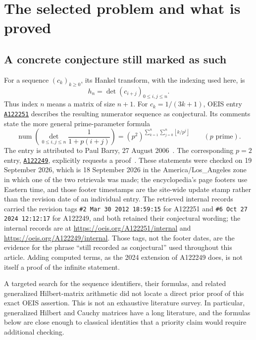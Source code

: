 \documentclass[11pt,a4paper]{article}
\numberwithin{equation}{section}
\theoremstyle{definition}
\theoremstyle{remark}
\newcommand{\num}{\operatorname{num}}
\newcommand{\floor}[1]{\left\lfloor#1\right\rfloor}
\newcommand{\OEIS}[1]{\href{https://oeis.org/#1}{\texttt{#1}}}
\begin{document}
\section{The selected problem and what is proved}\label{sec:problem}

\subsection{A concrete conjecture still marked as such}
For a sequence $(c_k)_{k\geq0}$, its Hankel transform, with the indexing used here, is
\[
 h_n=\det(c_{i+j})_{0\leq i,j\leq n}.
\]
Thus index $n$ means a matrix of size $n+1$. For $c_k=1/(3k+1)$, OEIS entry \OEIS{A122251} describes the resulting numerator sequence as conjectural. Its comments state the more general prime-parameter formula
\begin{equation}\label{eq:original}
 \num\left(\det_{0\leq i,j\leq n}\frac1{1+p(i+j)}\right)
 =(p^2)^{\displaystyle\sum_{k=1}^n\sum_{j=0}^n\floor{k/p^j}}
 \qquad(p\text{ prime}).
\end{equation}
The entry is attributed to Paul Barry, 27 August 2006~\cite{oeis251}. The corresponding $p=2$ entry, \OEIS{A122249}, explicitly requests a proof~\cite{oeis249}. These statements were checked on 19 September 2026, which is 18 September 2026 in the America/Los\_Angeles zone in which one of the two retrievals was made; the encyclopedia's page footers use Eastern time, and those footer timestamps are the site-wide update stamp rather than the revision date of an individual entry. The retrieved internal records carried the revision tags \texttt{\#2 Mar 30 2012 18:59:15} for A122251 and \texttt{\#6 Oct 27 2024 12:12:17} for A122249, and both retained their conjectural wording; the internal records are at \url{https://oeis.org/A122251/internal} and \url{https://oeis.org/A122249/internal}. Those tags, not the footer dates, are the evidence for the phrase ``still recorded as conjectural'' used throughout this article. Adding computed terms, as the 2024 extension of A122249 does, is not itself a proof of the infinite statement.

A targeted search for the sequence identifiers, their formulas, and related generalized Hilbert-matrix arithmetic did not locate a direct prior proof of this exact OEIS assertion. This is not an exhaustive literature survey. In particular, generalized Hilbert and Cauchy matrices have a long literature, and the formulas below are close enough to classical identities that a priority claim would require additional checking.
\end{document}
